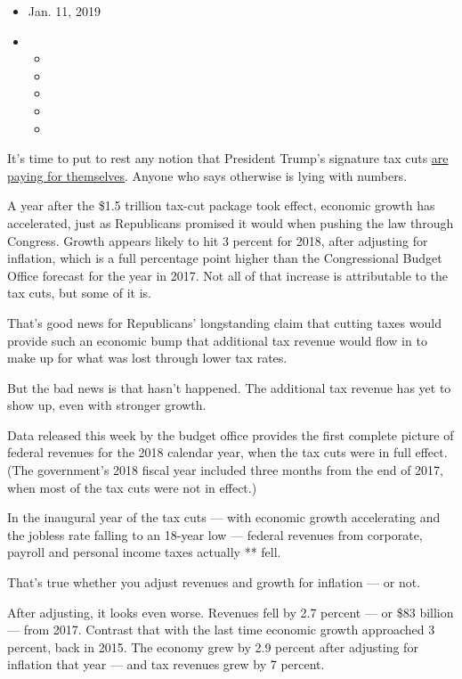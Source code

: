 \begin{itemize}
\item
  Jan. 11, 2019
\item
  \begin{itemize}
  \item
  \item
  \item
  \item
  \item
  \end{itemize}
\end{itemize}

It's time to put to rest any notion that President Trump's signature tax
cuts
\href{https://www.breitbart.com/economy/2019/01/09/deficitroseandsodidtaxes/}{are
paying for themselves}. Anyone who says otherwise is lying with numbers.

A year after the \$1.5 trillion tax-cut package took effect, economic
growth has accelerated, just as Republicans promised it would when
pushing the law through Congress. Growth appears likely to hit 3 percent
for 2018, after adjusting for inflation, which is a full percentage
point higher than the Congressional Budget Office forecast for the year
in 2017. Not all of that increase is attributable to the tax cuts, but
some of it is.

That's good news for Republicans' longstanding claim that cutting taxes
would provide such an economic bump that additional tax revenue would
flow in to make up for what was lost through lower tax rates.

But the bad news is that hasn't happened. The additional tax revenue has
yet to show up, even with stronger growth.

Data released this week by the budget office provides the first complete
picture of federal revenues for the 2018 calendar year, when the tax
cuts were in full effect. (The government's 2018 fiscal year included
three months from the end of 2017, when most of the tax cuts were not in
effect.)

In the inaugural year of the tax cuts --- with economic growth
accelerating and the jobless rate falling to an 18-year low --- federal
revenues from corporate, payroll and personal income taxes actually **
fell.

That's true whether you adjust revenues and growth for inflation --- or
not.

After adjusting, it looks even worse. Revenues fell by 2.7 percent ---
or \$83 billion --- from 2017. Contrast that with the last time economic
growth approached 3 percent, back in 2015. The economy grew by 2.9
percent after adjusting for inflation that year --- and tax revenues
grew by 7 percent.


